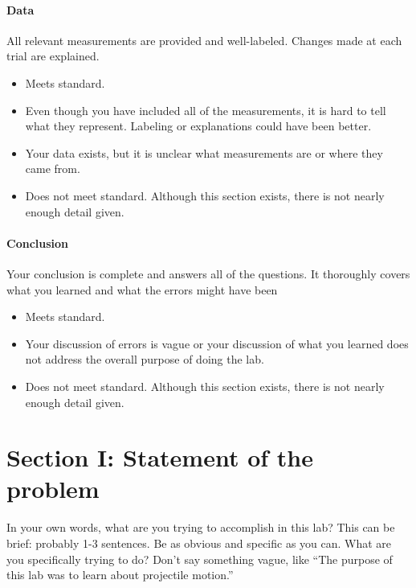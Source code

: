 \documentclass[10pt]{exam}
\begin{document}
\begin{Sbox}
\begin{minipage}{6.3in}
  \paragraph{Data} All relevant measurements are provided and well-labeled.  Changes made at each trial are explained.	
  \begin{itemize}
    \item[\bf 10:] Meets standard.	
    \item[\bf 8:] Even though you have included all of the measurements, it is hard to tell what they represent. Labeling or explanations could have been better. 
    \item[\bf 6:] Your data exists, but it is unclear what measurements are or where they came from.
    \item[\bf 4:] Does not meet standard.  Although this section exists, there is not nearly enough detail given.
  \end{itemize}

  \vspace{-0.25em}

  \paragraph{Conclusion} Your conclusion is complete and answers all of the questions.  It thoroughly covers what you learned and what the errors might have been	
  \begin{itemize}
    \item[\bf 5:] Meets standard.	
    \item[\bf 3:] Your discussion of errors is vague or your discussion of what you learned does not address the overall purpose of doing the lab.
    \item[\bf 2:]Does not meet standard. Although this section exists, there is not nearly enough detail given.
  \end{itemize}
\end{minipage}\end{Sbox}

\noindent
\shadowbox{\TheSbox}


\section*{Section I: Statement of the problem}
In your own words, what are you trying to accomplish in this lab?  This can be brief: probably 1-3 sentences.  Be as obvious and specific as you can.  What are you specifically trying to do?  Don't say something vague, like ``The purpose of this lab was to learn about projectile motion.''
\end{document}
